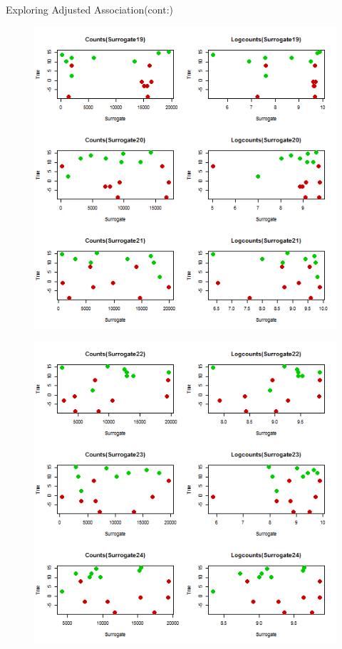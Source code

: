 \documentclass[a4paper,9pt]{beamer}\usepackage[]{graphicx}\usepackage[]{color}
\begin{document}
\begin{frame}{Exploring Adjusted Association(cont:)}
\begin{minipage}{0.3\textwidth}
\begin{figure}[H]
\includegraphics[scale=0.3]{first_presentation-figure/exploration-7.png}
\end{figure}
\end{minipage}
\hfill
\begin{minipage}{0.40\textwidth}
\begin{figure}[H]
\includegraphics[scale=0.3]{first_presentation-figure/exploration-8.png}
\end{figure}
\end{minipage}
\end{frame}
\end{document}
